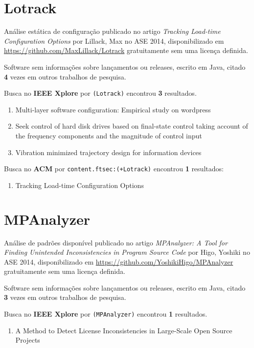 \section{Lotrack}

Análise estática de configuração
publicado no artigo {\it Tracking Load-time Configuration Options}
por Lillack, Max
no ASE 2014,
disponibilizado em \url{https://github.com/MaxLillack/Lotrack}
gratuitamente
sem uma licença definida.

Software sem informações sobre lançamentos ou releases,
escrito em Java,
citado {\bf 4} vezes em outros trabalhos de pesquisa.

Busca no {\bf IEEE Xplore} por
\texttt{(Lotrack)}
encontrou {\bf 3}
resultados.

\begin{enumerate}
\item Multi-layer software configuration: Empirical study on wordpress
\item Seek control of hard disk drives based on final-state control taking account of the frequency components and the magnitude of control input
\item Vibration minimized trajectory design for information devices
\end{enumerate}

Busca no {\bf ACM} por
\texttt{content.ftsec:(+Lotrack)}
encontrou {\bf 1}
resultados:

\begin{enumerate}
\item Tracking Load-time Configuration Options
\end{enumerate}

\section{MPAnalyzer}

Análise de padrões disponível
publicado no artigo {\it MPAnalyzer: A Tool for Finding Unintended Inconsistencies in Program Source Code}
por Higo, Yoshiki
no ASE 2014,
disponibilizado em \url{https://github.com/YoshikiHigo/MPAnalyzer}
gratuitamente
sem uma licença definida.

Software sem informações sobre lançamentos ou releases,
escrito em Java,
citado {\bf 3} vezes em outros trabalhos de pesquisa.

Busca no {\bf IEEE Xplore} por
\texttt{(MPAnalyzer)}
encontrou {\bf 1}
resultados.

\begin{enumerate}
\item A Method to Detect License Inconsistencies in Large-Scale Open Source Projects
\end{enumerate}

